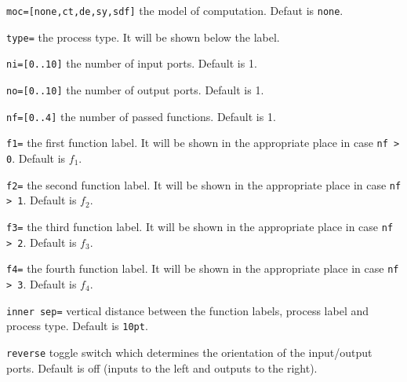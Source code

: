 \documentclass[10pt]{article}
\newenvironment{optionslist}[0]{ 
\begin{list}{}{
	\setlength{\itemindent}{-10pt}
	\setlength{\itemsep}{0pt}
	\setlength{\parsep}{0pt}
}}{\end{list}}
\newcommand\bookmark[1]{\marginpar{\ttfamily #1}}
\begin{document}
\hspace{1pt}\bookmark{\char`\\standard[shape=leaf,options]\{id\}\{position\}\{label\}}

\begin{optionslist}
\item \texttt{moc=[none,ct,de,sy,sdf]} the model of computation. Defaut is \texttt{none}.
\item \texttt{type=} the process type. It will be shown below the label.
\item \texttt{ni=[0..10]} the number of input ports. Default is 1.
\item \texttt{no=[0..10]} the number of output ports. Default is 1.
\item \texttt{nf=[0..4]} the number of passed functions. Default is 1.
\item \texttt{f1=} the first function label. It will be shown in the appropriate place in case \texttt{nf > 0}. Default is $f_1$.
\item \texttt{f2=} the second function label. It will be shown in the appropriate place in case \texttt{nf > 1}. Default is $f_2$.
\item \texttt{f3=} the third function label. It will be shown in the appropriate place in case \texttt{nf > 2}. Default is $f_3$.
\item \texttt{f4=} the fourth function label. It will be shown in the appropriate place in case \texttt{nf > 3}. Default is $f_4$.
\item\texttt{inner sep=} vertical distance between the function labels, process label and process type. Default is \texttt{10pt}.
\item\texttt{reverse} toggle switch which determines the orientation of the input/output ports. Default is off (inputs to the left and outputs to the right).
\end{optionslist}

\end{document}

